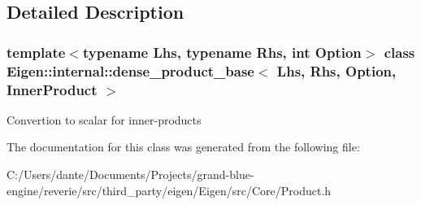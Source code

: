 \subsection{Detailed Description}
\subsubsection*{template$<$typename Lhs, typename Rhs, int Option$>$\newline
class Eigen\+::internal\+::dense\+\_\+product\+\_\+base$<$ Lhs, Rhs, Option, Inner\+Product $>$}

Convertion to scalar for inner-\/products 

The documentation for this class was generated from the following file\+:\begin{DoxyCompactItemize}
\item 
C\+:/\+Users/dante/\+Documents/\+Projects/grand-\/blue-\/engine/reverie/src/third\+\_\+party/eigen/\+Eigen/src/\+Core/Product.\+h\end{DoxyCompactItemize}
